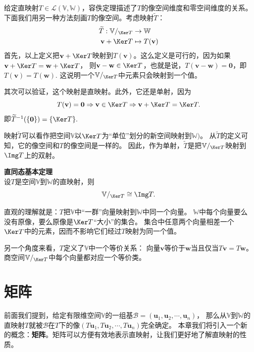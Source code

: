 \documentclass[12pt,UTF8,fontset=none]{ctexbook}
\begin{document}
给定直映射$T \in \mathcal{L}(\mathbb{V}, \mathbb{W})$，容佚定理描述了$T$的像空间维度和零空间维度的关系。
下面我们用另一种方法刻画$T$的像空间。考虑映射$\widetilde{T}$：
\begin{align*} 
    \widetilde{T} : \mathbb{V}/_{\Ker T} &\rightarrow \mathbb{W}  \\
    \mathbf{v} + \Ker T &\mapsto T(\mathbf{v}) 
\end{align*}
首先，以上定义把$\mathbf{v} + \Ker T$映射到$T(\mathbf{v})$。这么定义是可行的，因为如果$\mathbf{v} + \Ker T = \mathbf{w} + \Ker T$，
则$\mathbf{v} - \mathbf{w} \in \Ker T$，也就是说，$T(\mathbf{v} - \mathbf{w}) = \mathbf{0}$，即$T(\mathbf{v}) =T(\mathbf{w})$. 
这说明一个$\mathbb{V}/_{\Ker T}$中元素只会映射到一个值。

其次可以验证，这个映射是直映射。此外，它还是单射，因为
$$ T(\mathbf{v}) = \mathbf{0} \Rightarrow \mathbf{v} \in \Ker T \Rightarrow \mathbf{v} + \Ker T = \Ker T. $$
即$\widetilde{T}^{-1}(\{\mathbf{0}\}) = \{\Ker T\}.$

映射$\widetilde{T}$可以看作把空间$\mathbb{V}$以$\Ker T$为“单位”划分的新空间映射到$\mathbb{W})$。
从$\widetilde{T}$的定义可知，它的像空间和$T$的像空间是一样的。
因此，作为单射，$\widetilde{T}$是把$\mathbb{V}/_{\Ker T}$映射到$\Img T$上的双射。
\begin{pp}{\bfseries 直同态基本定理 }\label{pp:3_11}\\
    设$T$是空间$\mathbb{V}$到$\mathbb{W}$的直映射，则
    $$\mathbb{V}/_{\Ker T} \cong \Img T.$$
\end{pp}

直观的理解就是：$T$把$\mathbb{V}$中“一群”向量映射到$\mathbb{W}$中同一个向量。
$\mathbb{W}$中每个向量要么没有原像，要么原像是$\Ker T$“大小”的集合。
集合中任意两个向量相差一个$\Ker T$中的元素，因而不影响它们经过$T$映射为同一个值。

另一个角度来看，$T$定义了$\mathbb{V}$中一个等价关系：
向量$\mathbf{v}$等价于$\mathbf{w}$当且仅当$T\mathbf{v} = T\mathbf{w}$。
商空间$\mathbb{V}/_{\Ker T}$中每个向量都对应一个等价类。

\chapter{矩阵}

前面我们提到，给定有限维空间$\mathbb{V}$的一组基$\mathcal{B} = (\mathbf{u}_1, \mathbf{u}_2, \cdots, \mathbf{u}_n)$，
那么从$\mathbb{V}$到$\mathbb{W}$的直映射$T$就被$\mathcal{B}$在$T$下的像$(T\mathbf{u}_1, T\mathbf{u}_2, \cdots, T\mathbf{u}_n)$完全确定。
本章我们将引入一个新的概念：\textbf{矩阵}。矩阵可以方便有效地表示直映射，让我们更好地了解直映射的性质。
\end{document}
